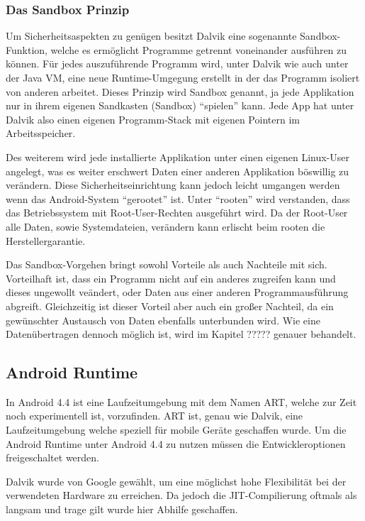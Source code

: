 \subsubsection{Das Sandbox Prinzip}
Um Sicherheitsaspekten zu gen\"ugen besitzt Dalvik eine sogenannte Sandbox-Funktion, welche es erm\"oglicht Programme getrennt voneinander ausf\"uhren zu k\"onnen. F\"ur jedes auszuf\"uhrende Programm wird, unter Dalvik wie auch unter der Java VM, eine neue Runtime-Umgegung erstellt in der das Programm isoliert von anderen arbeitet. 
Dieses Prinzip wird Sandbox genannt, ja jede Applikation nur in ihrem eigenen Sandkasten (Sandbox) "`spielen"' kann. Jede App hat unter Dalvik also einen eigenen Programm-Stack mit eigenen Pointern im Arbeitsspeicher.

Des weiterem wird jede installierte Applikation unter einen eigenen Linux-User angelegt, was es weiter erschwert Daten einer anderen Applikation b\"oswillig zu ver\"andern. Diese Sicherheitseinrichtung kann jedoch leicht umgangen werden wenn das Android-System "`gerootet"' ist. Unter "`rooten"' wird verstanden, dass das Betriebssystem mit Root-User-Rechten ausgef\"uhrt wird. Da der Root-User alle Daten, sowie Systemdateien, ver\"andern kann erlischt beim rooten die Herstellergarantie. \cite{Android44}

Das Sandbox-Vorgehen bringt sowohl Vorteile als auch Nachteile mit sich. Vorteilhaft ist, dass ein Programm nicht auf ein anderes zugreifen kann und dieses ungewollt ve\"andert, oder Daten aus einer anderen Programmausf\"uhrung abgreift. Gleichzeitig ist dieser Vorteil aber auch ein gro\ss{}er Nachteil, da ein gew\"unschter Austausch von Daten ebenfalls unterbunden wird.
Wie eine Daten\"ubertragen dennoch m\"oglich ist, wird im Kapitel ????? genauer behandelt.

\subsection{Android Runtime}
In Android 4.4 ist eine Laufzeitumgebung mit dem Namen \ac{ART}, welche zur Zeit noch experimentell ist, vorzufinden. \ac{ART} ist, genau wie Dalvik, eine Laufzeitumgebung welche speziell f\"ur mobile Ger\"ate geschaffen wurde. Um die Android Runtime unter Android 4.4 zu nutzen m\"ussen die Entwickleroptionen freigeschaltet werden.

Dalvik wurde von Google gew\"ahlt, um eine m\"oglichst hohe Flexibilit\"at bei der verwendeten Hardware zu erreichen. Da jedoch die \ac{JIT}-Compilierung oftmals als langsam und trage gilt wurde hier Abhilfe geschaffen.

